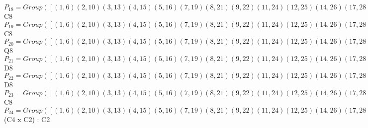 \documentclass[varwidth=\maxdimen,border=10]{standalone}
\begin{document}
\begin{tabular}
$P_{18} = Group( [ ( 1, 6)( 2,10)( 3,13)( 4,15)( 5,16)( 7,19)( 8,21)( 9,22)(11,24)(12,25)(14,26)(17,28)(18,29)(20,30)(23,31)(27,32), ( 1, 5, 6,16)( 2, 9,10,22)( 3,12,13,25)( 4,14,15,26)( 7,18,19,29)( 8,20,21,30)(11,23,24,31)(17,27,28,32), ( 1, 7, 5,18, 6,19,16,29)( 2,12, 9,13,10,25,22, 3)( 4,28,14,32,15,17,26,27)( 8,31,20,11,21,23,30,24) ] )\cong$ C8\ \\
$P_{19} = Group( [ ( 1, 6)( 2,10)( 3,13)( 4,15)( 5,16)( 7,19)( 8,21)( 9,22)(11,24)(12,25)(14,26)(17,28)(18,29)(20,30)(23,31)(27,32), ( 1, 5, 6,16)( 2, 9,10,22)( 3,12,13,25)( 4,14,15,26)( 7,18,19,29)( 8,20,21,30)(11,23,24,31)(17,27,28,32), ( 1,28,16,27, 6,17, 5,32)( 2,31,22,24,10,23, 9,11)( 3,21,25,20,13, 8,12,30)( 4, 7,26,29,15,19,14,18) ] )\cong$ C8\ \\
$P_{20} = Group( [ ( 1, 6)( 2,10)( 3,13)( 4,15)( 5,16)( 7,19)( 8,21)( 9,22)(11,24)(12,25)(14,26)(17,28)(18,29)(20,30)(23,31)(27,32), ( 1,14, 6,26)( 2,20,10,30)( 3,23,13,31)( 4, 5,15,16)( 7,27,19,32)( 8, 9,21,22)(11,12,24,25)(17,18,28,29), ( 1,12, 6,25)( 2,18,10,29)( 3, 5,13,16)( 4,31,15,23)( 7, 9,19,22)( 8,32,21,27)(11,26,24,14)(17,30,28,20) ] )\cong$ Q8\ \\
$P_{21} = Group( [ ( 1, 6)( 2,10)( 3,13)( 4,15)( 5,16)( 7,19)( 8,21)( 9,22)(11,24)(12,25)(14,26)(17,28)(18,29)(20,30)(23,31)(27,32), ( 1,14, 6,26)( 2,20,10,30)( 3,23,13,31)( 4, 5,15,16)( 7,27,19,32)( 8, 9,21,22)(11,12,24,25)(17,18,28,29), ( 1, 3)( 2, 7)( 4,24)( 5,12)( 6,13)( 8,28)( 9,18)(10,19)(11,15)(14,31)(16,25)(17,21)(20,32)(22,29)(23,26)(27,30) ] )\cong$ D8\ \\
$P_{22} = Group( [ ( 1, 6)( 2,10)( 3,13)( 4,15)( 5,16)( 7,19)( 8,21)( 9,22)(11,24)(12,25)(14,26)(17,28)(18,29)(20,30)(23,31)(27,32), ( 1, 4)( 2, 8)( 3,11)( 5,14)( 6,15)( 7,17)( 9,20)(10,21)(12,23)(13,24)(16,26)(18,27)(19,28)(22,30)(25,31)(29,32), ( 1,12, 6,25)( 2,18,10,29)( 3, 5,13,16)( 4,31,15,23)( 7, 9,19,22)( 8,32,21,27)(11,26,24,14)(17,30,28,20) ] )\cong$ D8\ \\
$P_{23} = Group( [ ( 1, 6)( 2,10)( 3,13)( 4,15)( 5,16)( 7,19)( 8,21)( 9,22)(11,24)(12,25)(14,26)(17,28)(18,29)(20,30)(23,31)(27,32), ( 1, 5, 6,16)( 2, 9,10,22)( 3,12,13,25)( 4,14,15,26)( 7,18,19,29)( 8,20,21,30)(11,23,24,31)(17,27,28,32), ( 1, 2, 5, 9, 6,10,16,22)( 3, 7,12,18,13,19,25,29)( 4, 8,14,20,15,21,26,30)(11,17,23,27,24,28,31,32) ] )\cong$ C8\ \\
$P_{24} = Group( [ ( 1, 6)( 2,10)( 3,13)( 4,15)( 5,16)( 7,19)( 8,21)( 9,22)(11,24)(12,25)(14,26)(17,28)(18,29)(20,30)(23,31)(27,32), ( 1, 5, 6,16)( 2, 9,10,22)( 3,12,13,25)( 4,14,15,26)( 7,18,19,29)( 8,20,21,30)(11,23,24,31)(17,27,28,32), ( 1, 4)( 2, 8)( 3,11)( 5,14)( 6,15)( 7,17)( 9,20)(10,21)(12,23)(13,24)(16,26)(18,27)(19,28)(22,30)(25,31)(29,32), ( 1, 3)( 2, 7)( 4,24)( 5,12)( 6,13)( 8,28)( 9,18)(10,19)(11,15)(14,31)(16,25)(17,21)(20,32)(22,29)(23,26)(27,30) ] )\cong$ (C4 x C2) : C2\ \\

\end{tabular}
\end{document}
